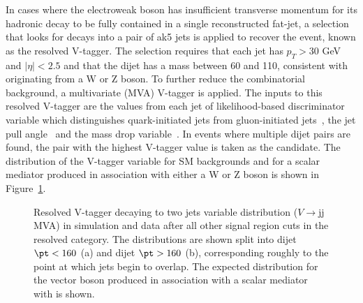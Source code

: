 In cases where the electroweak boson has insufficient transverse momentum for
its hadronic decay to be fully contained in a single reconstructed fat-jet, a
selection that looks for decays into a pair of ak5 jets is applied to recover
the event, known as the resolved V-tagger.  The selection requires that each jet
has $p_T>30$ GeV and $|\eta|<2.5$ and that the dijet has a mass between 60\gev
and 110\gev, consistent with originating from a W or Z boson. To further reduce
the combinatorial background, a multivariate (MVA)  V-tagger is applied. The
inputs to this resolved V-tagger are the values from each jet of
likelihood-based discriminator variable which distinguishes quark-initiated jets
from gluon-initiated jets~\cite{JME-14-002}, the jet pull
angle~\cite{Gallicchio:2010sw} and the mass drop
variable~\cite{Izaguirre:2014ira}. In events where multiple dijet pairs are
found, the pair with the highest V-tagger value is taken as the candidate. The
distribution of the V-tagger variable for SM backgrounds and for a scalar
mediator produced in association with either a W or Z boson is shown in
Figure~\ref{fig:vtagger}.  \begin{figure}[hbtp]\begin{center} 
 \caption{ Resolved V-tagger decaying to two jets variable distribution
($V\rightarrow$jj  MVA) in simulation and data after all other signal region
cuts in the resolved category.  The distributions are shown split into dijet
$\pt < 160$ \gev (a) and dijet $\pt > 160$ \gev (b), corresponding roughly to
the point at which jets begin to overlap.  The expected distribution for the
vector boson produced in association with a scalar mediator with is shown.}
\label{fig:vtagger}\end{center}\end{figure}

